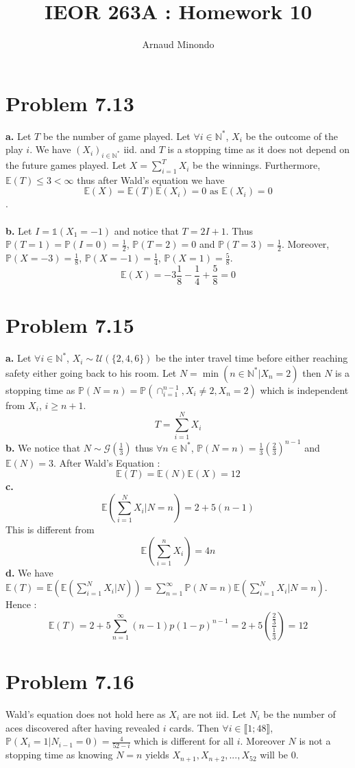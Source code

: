 \documentclass{article}
\title{IEOR 263A : Homework 10}
\author{Arnaud Minondo}
\begin{document}
\maketitle
\section*{Problem 7.13}
\textbf{a.} Let $T$ be the number of game played. Let $\forall i \in\mathbb{N}^*$, $X_i$ be the outcome of the play $i$. We have $(X_i)_{i\in\mathbb{N}^*}$ iid. and $T$ is a stopping time as it does not depend on the future games played. Let $X = \sum\limits_{i=1}^TX_i$ be the winnings. Furthermore, $\mathbb{E}(T)\leq 3<\infty$ thus after Wald's equation we have $$\boxed{\mathbb{E}(X) = \mathbb{E}(T)\mathbb{E}(X_i) = 0\text{ as }\mathbb{E}(X_i) = 0}$$.
\\\\
\textbf{b.} Let $I = \mathds{1}(X_1 = -1)$ and notice that $T=2I+1$. Thus $\mathbb{P}(T=1) = \mathbb{P}(I=0) = \frac{1}{2}$, $\mathbb{P}(T=2) = 0$ and $\mathbb{P}(T=3) = \frac{1}{2}$. Moreover, $\mathbb{P}(X=-3) = \frac{1}{8}$, $\mathbb{P}(X = -1) = \frac{1}{4}$, $\mathbb{P}(X=1) = \frac{5}{8}$. $$\boxed{\mathbb{E}(X) = -3\frac{1}{8} -\frac{1}{4}+\frac{5}{8} = 0 }$$ 
\section*{Problem 7.15}
\textbf{a.} Let $\forall i\in\mathbb{N}^*$, $X_i\sim\mathcal{U}(\{2,4,6\})$ be the inter travel time before either reaching safety either going back to his room. Let $N = \min(n\in\mathbb{N}^*|X_n=2)$ then $N$ is a stopping time as $\mathbb{P}(N=n)=\mathbb{P}(\cap_{i=1}^{n-1},X_i\neq 2,X_n=2)$ which is independent from $X_i$, $i\ge n+1$. $$\boxed{T = \sum\limits_{i=1}^NX_i}$$
\textbf{b.} We notice that $N\sim \mathcal{G}(\frac{1}{3})$ thus $\forall n\in\mathbb{N}^*$, $\mathbb{P}(N=n) = \frac{1}{3}(\frac{2}{3})^{n-1}$ and $\mathbb{E}(N) = 3$. After Wald's Equation : $$\boxed{\mathbb{E}(T) = \mathbb{E}(N)\mathbb{E}(X) = 12}$$
\textbf{c.} $$\boxed{\mathbb{E}\left(\sum_{i=1}^NX_i|N=n\right) = 2+5(n-1)}$$
This is different from $$\boxed{\mathbb{E}\left(\sum_{i=1}^nX_i\right) = 4n}$$
\textbf{d.} We have $\mathbb{E}(T) = \mathbb{E}\left(\mathbb{E}(\sum\limits_{i=1}^NX_i|N)\right) = \sum\limits_{n=1}^\infty\mathbb{P}(N=n)\mathbb{E}\left(\sum\limits_{i=1}^NX_i|N=n\right)$. Hence : $$\boxed{\mathbb{E}(T) = 2+5\sum_{n=1}^\infty(n-1)p(1-p)^{n-1} = 2 + 5\left(\dfrac{\frac{2}{3}}{\frac{1}{3}}\right) = 12}$$
\section*{Problem 7.16}
Wald's equation does not hold here as $X_i$ are not iid. Let $N_i$ be the number of aces discovered after having revealed $i$ cards. Then $\forall i\in\llbracket 1;48\rrbracket$, $\mathbb{P}(X_i=1|N_{i-1}=0) = \frac{4}{52-i}$ which is different for all $i$. Moreover $N$ is not a stopping time as knowing $N=n$ yields $X_{n+1},X_{n+2},...,X_{52}$ will be 0. 
\end{document}
